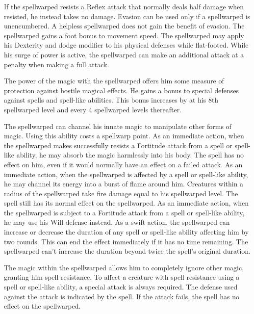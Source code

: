  If the spellwarped resists a Reflex attack that normally deals half damage when resisted, he instead takes no damage. Evasion can be used only if a spellwarped is unencumbered. A helpless spellwarped does not gain the benefit of evasion.
 The spellwarped gains a  foot bonus to movement speed.
 The spellwarped may apply his Dexterity and dodge modifier to his physical defenses while flat-footed.
 While his surge of power is active, the spellwarped can make an additional attack at a  penalty when making a full attack.

 The power of the magic with the spellwarped offers him some measure of protection against hostile magical effects. He gains a  bonus to special defenses against spells and spell-like abilities. This bonus increases by  at his 8th spellwarped level and every 4 spellwarped levels thereafter.

 The spellwarped can channel his innate magic to manipulate other forms of magic. Using this ability costs a spellwarp point. 
 As an immediate action, when the spellwarped makes successfully resists a Fortitude attack from a spell or spell-like ability, he may absorb the magic harmlessly into his body. The spell has no effect on him, even if it would normally have an effect on a failed attack.
 As an immediate action, when the spellwarped is affected by a spell or spell-like ability, he may channel its energy into a burst of flame around him. Creatures within a \areasmall radius of the spellwarped take fire damage equal to his spellwarped level. The spell still has its normal effect on the spellwarped.
 As an immediate action, when the spellwarped is subject to a Fortitude attack from a spell or spell-like ability, he may use his Will defense instead.
 As a swift action, the spellwarped can increase or decrease the duration of any spell or spell-like ability affecting him by two rounds. This can end the effect immediately if it has no time remaining. The spellwarped can't increase the duration beyond twice the spell's original duration.

 The magic within the spellwarped allows him to completely ignore other magic, granting him spell resistance. To affect a creature with spell resistance using a spell or spell-like ability, a special attack is always required. The defense used against the attack is indicated by the spell. If the attack fails, the spell has no effect on the spellwarped.

